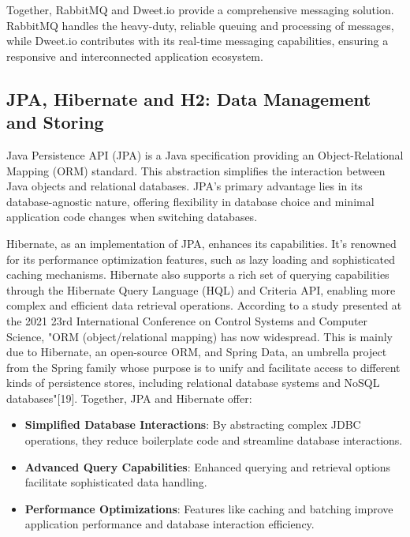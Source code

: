 Together, RabbitMQ and Dweet.io provide a comprehensive messaging solution. RabbitMQ handles the heavy-duty, reliable queuing and processing of messages, while Dweet.io contributes with its real-time messaging capabilities, ensuring a responsive and interconnected application ecosystem.



\subsection{JPA, Hibernate and H2: Data Management and Storing}

Java Persistence API (JPA) is a Java specification providing an Object-Relational Mapping (ORM) standard. 
This abstraction simplifies the interaction between Java objects and relational databases. 
JPA's primary advantage lies in its database-agnostic nature, offering flexibility in database choice and minimal application code changes when switching databases.

Hibernate, as an implementation of JPA, enhances its capabilities. 
It's renowned for its performance optimization features, such as lazy loading and sophisticated caching mechanisms. 
Hibernate also supports a rich set of querying capabilities through the Hibernate Query Language (HQL) and Criteria API, enabling more complex and efficient data retrieval operations. 
According to a study presented at the 2021 23rd International Conference on Control Systems and Computer Science, "ORM (object/relational mapping) has now widespread. This is mainly due to Hibernate, an open-source ORM, and Spring Data, an umbrella project from the Spring family whose purpose is to unify and facilitate access to different kinds of persistence stores, including relational database systems and NoSQL databases"[19].
Together, JPA and Hibernate offer:

\begin{itemize}
  \item \textbf{Simplified Database Interactions}: By abstracting complex JDBC operations, they reduce boilerplate code and streamline database interactions.
  \item \textbf{Advanced Query Capabilities}: Enhanced querying and retrieval options facilitate sophisticated data handling.
  \item \textbf{Performance Optimizations}: Features like caching and batching improve application performance and database interaction efficiency.
\end{itemize}

